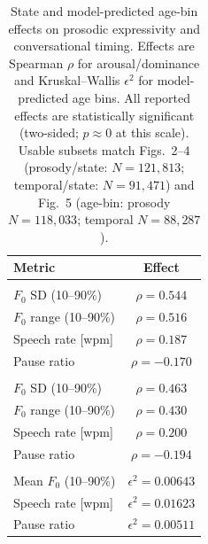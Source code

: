 \documentclass[conference]{IEEEtran}
\begin{document}
\begin{table}[t]
\centering
\caption{State and model-predicted age-bin effects on prosodic expressivity and conversational timing. Effects are Spearman $\rho$ for arousal/dominance and Kruskal--Wallis $\epsilon^2$ for model-predicted age bins. All reported effects are statistically significant (two-sided; $p\approx 0$ at this scale). Usable subsets match Figs.~2--4 (prosody/state: $N{=}121{,}813$; temporal/state: $N{=}91{,}471$) and Fig.~5 (age-bin: prosody $N{=}118{,}033$; temporal $N{=}88{,}287$).}
\label{tab:state_age_effects}
\small
\setlength{\tabcolsep}{4pt}
\begin{tabular}{l c}
\toprule
\textbf{Metric} & \textbf{Effect} \\
\midrule
\rowcolor{gray!20}\multicolumn{2}{c}{\textbf{Arousal effects (Spearman $\rho$)}} \\
$F_0$ SD (10--90\%)            & $\rho=0.544$ \\
$F_0$ range (10--90\%)         & $\rho=0.516$ \\
Speech rate [wpm]              & $\rho=0.187$ \\
Pause ratio                    & $\rho=-0.170$ \\
\midrule
\rowcolor{gray!20}\multicolumn{2}{c}{\textbf{Dominance effects (Spearman $\rho$)}} \\
$F_0$ SD (10--90\%)            & $\rho=0.463$ \\
$F_0$ range (10--90\%)         & $\rho=0.430$ \\
Speech rate [wpm]              & $\rho=0.200$ \\
Pause ratio                    & $\rho=-0.194$ \\
\midrule
\rowcolor{gray!20}\multicolumn{2}{c}{\textbf{Model-predicted age-bin effects (Kruskal--Wallis $\epsilon^2$)}} \\
Mean $F_0$ (10--90\%)          & $\epsilon^2=0.00643$ \\
Speech rate [wpm]              & $\epsilon^2=0.01623$ \\
Pause ratio                    & $\epsilon^2=0.00511$ \\
\bottomrule
\end{tabular}
\end{table}
\end{document}
